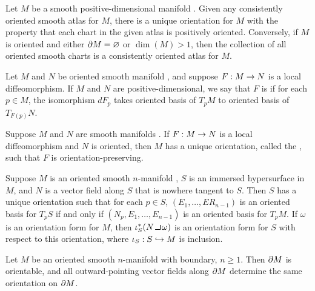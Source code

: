 \begin{prop}
Let $M$ be a smooth positive-dimensional manifold \wowob. Given any consistently oriented smooth atlas for $M$, there is a unique orientation for $M$ with the property that each chart in the given atlas is positively oriented. Conversely, if $M$ is oriented and either $\partial M = \varnothing$ or $\dim(M) > 1$, then the collection of all oriented smooth charts is a consistently oriented atlas for $M$.
\end{prop}

\dfng Let $M$ and $N$ be oriented smooth manifold \wowob, and suppose $F:M\rightarrow N$ is a local diffeomorphism. If $M$ and $N$ are positive-dimensional, we say that $F$ is  if for each $p\in M$, the isomorphism $dF_p$ takes oriented basis of $T_pM$ to oriented basis of $T_{F(p)}N$.

\setcounter{thm}{14}

\begin{prop}
Suppose $M$ and $N$ are smooth manifolds \wowob. If $F:M\rightarrow N$ is a local diffeomorphism and $N$ is oriented, then $M$ has a unique orientation, called the , such that $F$ is orientation-preserving.
\end{prop}

\setcounter{thm}{16}

\begin{prop}
\end{prop}

\setcounter{thm}{20}

\begin{prop}
Suppose $M$ is an oriented smooth $n$-manifold \wowob, $S$ is an immersed hypersurface \wowob in $M$, and $N$ is a vector field along $S$ that is nowhere tangent to $S$. Then $S$ has a unique orientation such that for each $p\in S$, $(E_1,\ldots,ER_{n - 1})$ is an oriented basis for $T_pS$ if and only if $(N_p,E_1,\ldots,E_{n - 1})$ is an oriented basis for $T_pM$. If $\omega$ is an orientation form for $M$, then $\iota^*_S(N\hook \omega)$ is an orientation form for $S$ with respect to this orientation, where $\iota_S:S\hookrightarrow M$ is inclusion.
\end{prop}

\setcounter{thm}{23}

\begin{prop}
Let $M$ be an oriented smooth $n$-manifold with boundary, $n\geq 1$. Then $\partial M$ is orientable, and all outward-pointing vector fields along $\partial M$ determine the same orientation on $\partial M$.
\end{prop}
